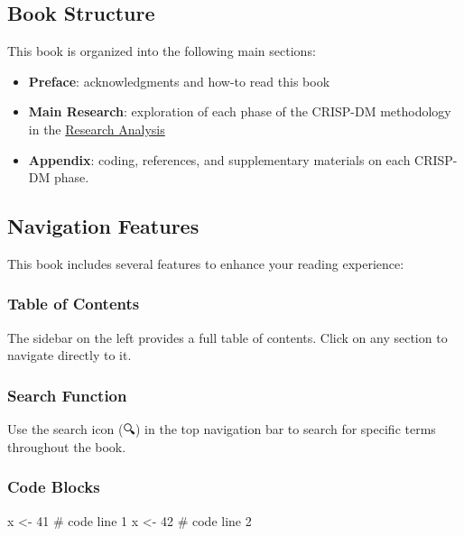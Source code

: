 \documentclass[
  american,
  10,
  a4paper,
]{book}
\newenvironment{Shaded}{\begin{snugshade}}{\end{snugshade}}
\newcommand{\CommentTok}[1]{\textcolor[rgb]{0.37,0.37,0.37}{#1}}
\newcommand{\DecValTok}[1]{\textcolor[rgb]{0.68,0.00,0.00}{#1}}
\newcommand{\NormalTok}[1]{\textcolor[rgb]{0.00,0.23,0.31}{#1}}
\newcommand{\OtherTok}[1]{\textcolor[rgb]{0.00,0.23,0.31}{#1}}
\providecommand{\tightlist}{%
  \setlength{\itemsep}{0pt}\setlength{\parskip}{0pt}}
\theoremstyle{definition}
\theoremstyle{remark}
\begin{document}
\subsection{Book Structure}\label{book-structure}

This book is organized into the following main sections:

\begin{itemize}
\tightlist
\item
  \textbf{Preface}: acknowledgments and how-to read this book
\item
  \textbf{Main Research}: exploration of each phase of the CRISP-DM
  methodology in the \href{nb/00_pythias_advice_rev.html}{Research
  Analysis}
\item
  \textbf{Appendix}: coding, references, and supplementary materials on
  each CRISP-DM phase.
\end{itemize}

\subsection{Navigation Features}\label{navigation-features}

This book includes several features to enhance your reading experience:

\subsubsection{Table of Contents}\label{table-of-contents}

The sidebar on the left provides a full table of contents. Click on any
section to navigate directly to it.

\subsubsection{Search Function}\label{search-function}

Use the search icon (🔍) in the top navigation bar to search for
specific terms throughout the book.

\subsubsection{Code Blocks}\label{code-blocks}

\begin{Shaded}
\begin{Highlighting}[]
\NormalTok{x }\OtherTok{\textless{}{-}} \DecValTok{41}   \CommentTok{\# code line 1}
\NormalTok{x }\OtherTok{\textless{}{-}} \DecValTok{42}   \CommentTok{\# code line 2}
\end{Highlighting}
\end{Shaded}
\end{document}

